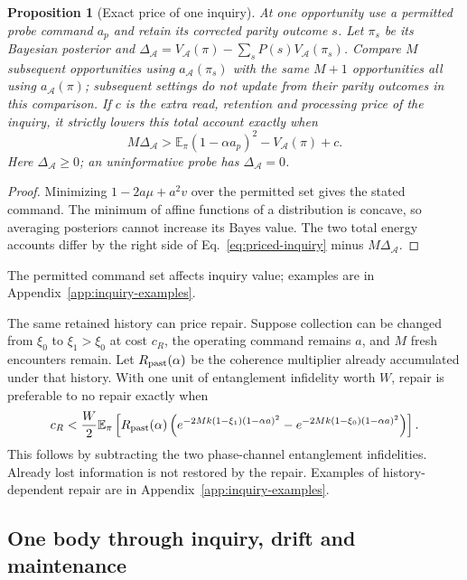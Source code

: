 \documentclass[11pt]{article}
\newtheorem{proposition}[theorem]{Proposition}
\theoremstyle{definition}
\theoremstyle{remark}
\begin{document}
\begin{proposition}[Exact price of one inquiry]
\label{prop:priced-inquiry}
At one opportunity use a permitted probe command $a_p$ and retain its corrected parity
outcome $s$. Let $\pi_s$ be its Bayesian posterior and
$\Delta_{\mathcal A}=V_{\mathcal A}(\pi)-\sum_sP(s)V_{\mathcal A}(\pi_s)$.
Compare $M$ subsequent opportunities using $a_{\mathcal A}(\pi_s)$ with
the same $M+1$ opportunities all using $a_{\mathcal A}(\pi)$;
subsequent settings do not update from their parity outcomes in this comparison.
If $c$ is the extra read, retention and processing price of the inquiry, it
strictly lowers this total account exactly when
\begin{equation}
 M\Delta_{\mathcal A}>
 \mathbb E_\pi(1-\alpha a_p)^2-V_{\mathcal A}(\pi)+c.
 \label{eq:priced-inquiry}
\end{equation}
Here $\Delta_{\mathcal A}\ge0$; an uninformative probe has
$\Delta_{\mathcal A}=0$.
\end{proposition}
\begin{proof}
Minimizing $1-2a\mu+a^2v$ over the permitted set gives the stated command.
The minimum of affine functions of a distribution is concave, so averaging
posteriors cannot increase its Bayes value. The two total energy accounts
differ by the right side of Eq.~\eqref{eq:priced-inquiry} minus
$M\Delta_{\mathcal A}$.
\end{proof}

The permitted command set affects inquiry value; examples are in
Appendix~\ref{app:inquiry-examples}.

The same retained history can price repair. Suppose collection can be changed
from $\xi_0$ to $\xi_1>\xi_0$ at cost $c_R$, the operating command remains
$a$, and $M$ fresh encounters remain. Let $R_{\rm past}(\alpha)$ be the
coherence multiplier already accumulated under that history. With one unit of
entanglement infidelity worth $W$, repair is preferable to no repair exactly when
\begin{equation}
 c_R<\frac W2\mathbb E_\pi\left[
 R_{\rm past}(\alpha)
 \left(e^{-2Mk(1-\xi_1)(1-\alpha a)^2}
       -e^{-2Mk(1-\xi_0)(1-\alpha a)^2}\right)\right].
 \label{eq:collection-repair}
\end{equation}
This follows by subtracting the two phase-channel entanglement infidelities.
Already lost information is not restored by the repair. Examples of history-dependent repair are in Appendix~\ref{app:inquiry-examples}.

\subsection{One body through inquiry, drift and maintenance}
\label{sec:joint-held-loop}
\end{document}
